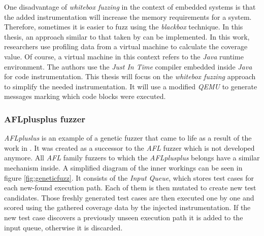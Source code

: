 One disadvantage of \textit{whitebox fuzzing} in the context of embedded systems is that the added instrumentation will increase the memory requirements for a system. Therefore, sometimes it is easier to fuzz using the \textit{blackbox} technique. In this thesis, an approach similar to that taken by \cite{tracecoverage} can be implemented. In this work, researchers use profiling data from a virtual machine to calculate the coverage value. Of course, a virtual machine in this context refers to the \textit{Java} runtime environment. The authors use the \textit{Just In Time} compiler embedded inside \textit{Java} for code instrumentation. This thesis will focus on the \textit{whitebox fuzzing} approach to simplify the needed instrumentation. It will use a modified \textit{QEMU} to generate messages marking which code blocks were executed.

\subsubsection{AFLplusplus fuzzer} \label{sec:afl}

\textit{AFLpluslus} is an example of a genetic fuzzer that came to life as a result of the work in \cite{AFLplusplus-Woot20}. It was created as a successor to the \textit{AFL} fuzzer which is not developed anymore. All \textit{AFL} family fuzzers to which the \textit{AFLplusplus} belongs have a similar mechanism inside. A simplified diagram of the inner workings can be seen in figure \ref{fig:geneticfuzz}. It consists of the \textit{Input Queue}, which stores test cases for each new-found execution path. Each of them is then mutated to create new test candidates. Those freshly generated test cases are then executed one by one and scored using the gathered coverage data by the injected instrumentation. If the new test case discovers a previously unseen execution path it is added to the input queue, otherwise it is discarded.

